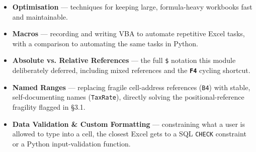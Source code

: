 \documentclass[11pt,a4paper]{article}
\newcommand{\key}[1]{\texttt{\colorbox{black!8}{\textbf{#1}}}}
\begin{document}
\begin{itemize}
  \item \textbf{Optimisation} --- techniques for keeping large, formula-heavy workbooks fast and maintainable.
  \item \textbf{Macros} --- recording and writing VBA to automate repetitive Excel tasks, with a comparison to automating the same tasks in Python.
  \item \textbf{Absolute vs. Relative References} --- the full \texttt{\$} notation this module deliberately deferred, including mixed references and the \key{F4} cycling shortcut.
  \item \textbf{Named Ranges} --- replacing fragile cell-address references (\texttt{B4}) with stable, self-documenting names (\texttt{TaxRate}), directly solving the positional-reference fragility flagged in \S 3.1.
  \item \textbf{Data Validation \& Custom Formatting} --- constraining what a user is allowed to type into a cell, the closest Excel gets to a SQL \texttt{CHECK} constraint or a Python input-validation function.
\end{itemize}
\end{document}
